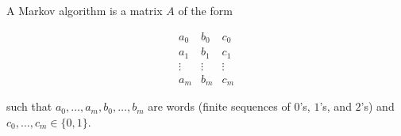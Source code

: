 A Markov algorithm is a matrix $A$ of the form

$$
\begin{array}{cccc}
a_0 & b_0 & c_0 \\
a_1 & b_1 & c_1 \\
\vdots & \vdots & \vdots \\
a_m & b_m & c_m
\end{array}
$$

such that $a_0, \ldots, a_m, b_0, \ldots, b_m$ are words (finite sequences of $0$'s, $1$'s, and $2$'s) and $c_0, \ldots, c_m \in \{0, 1\}$.
